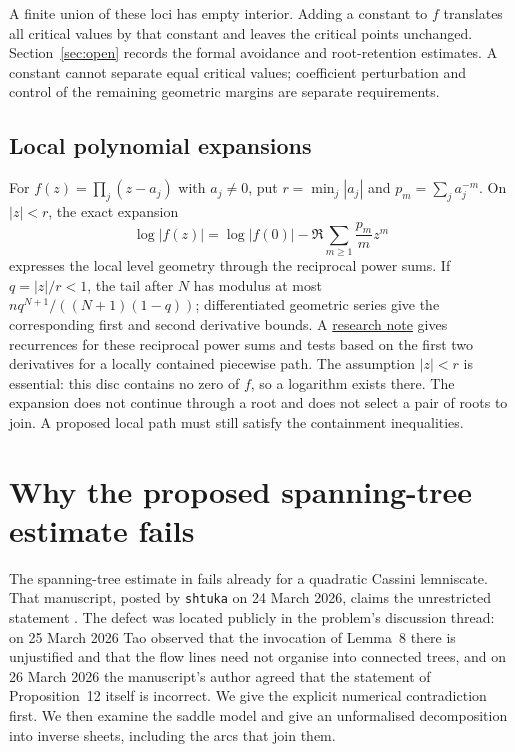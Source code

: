 \noindent A finite union of these loci has empty interior. Adding a constant to
$f$ translates all critical values by that constant and leaves the critical
points unchanged. Section~\ref{sec:open} records the formal avoidance and
root-retention estimates. A constant cannot separate equal critical values;
coefficient perturbation and control of the remaining geometric margins
are separate requirements.

\subsection*{Local polynomial expansions}\label{subsec:local-polynomial-expansions}

For $f(z)=\prod_j(z-a_j)$ with $a_j\ne0$, put $r=\min_j|a_j|$ and
$p_m=\sum_j a_j^{-m}$.  On $|z|<r$, the exact expansion
\[
 \log|f(z)|=\log|f(0)|-\Re\sum_{m\ge1}\frac{p_m}{m}z^m
\]
expresses the local level geometry through the reciprocal power sums.  If $q=|z|/r<1$,
the tail after $N$ has modulus at most
$nq^{N+1}/((N+1)(1-q))$; differentiated geometric series give the
corresponding first and second derivative bounds.
A \href{https://github.com/wcook04/plectis-erdos/blob/f36a98bf3d3e6f65f1074e3b800e3293d5b8a51a/ErdosProblems/Erdos1041/ReciprocalNewtonExpansion.md}{research note}
gives recurrences for these reciprocal power sums and tests based on the
first two derivatives for a locally contained piecewise path.
The assumption $|z|<r$ is essential: this disc contains no zero of $f$,
so a logarithm exists there. The expansion does not continue through a
root and does not select a pair of roots to join. A proposed local path
must still satisfy the containment inequalities.


\section{Why the proposed spanning-tree estimate fails}\label{sec:gap}

The spanning-tree estimate in \cite[Proposition~12]{march2026} fails
already for a quadratic Cassini lemniscate. That manuscript, posted by
\texttt{shtuka} on 24 March 2026, claims the unrestricted statement
\cite[Theorem~1, p.~1]{march2026}. The defect was located publicly in the
problem's discussion thread: on 25 March 2026 Tao observed that the
invocation of Lemma~8 there is unjustified and that the flow lines need not
organise into connected trees, and on 26 March 2026 the manuscript's author
agreed that the statement of Proposition~12 itself is incorrect. We give the
explicit numerical contradiction first. We then examine the saddle
model and give an unformalised decomposition into inverse sheets,
including the arcs that join them.


